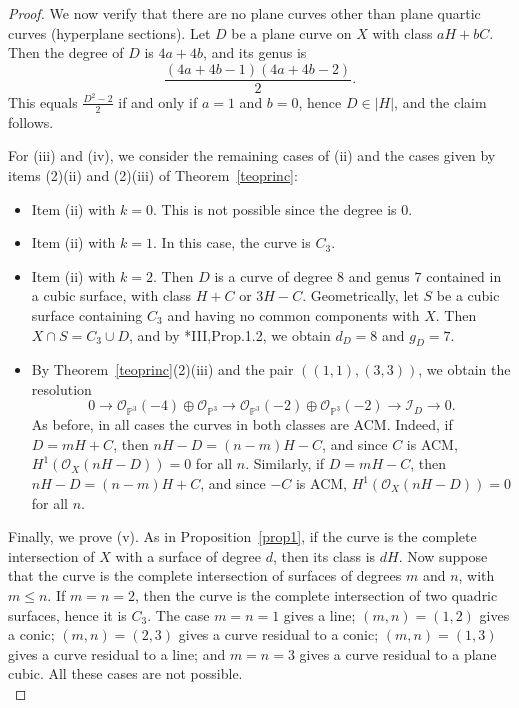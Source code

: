 \documentclass[12pt,reqno]{amsart}
\theoremstyle{plain}
\theoremstyle{definition}
\theoremstyle{remark}
\theoremstyle{definition}
\newcommand{\PP}{\mathds{P}}
\newcommand{\PPP}{\PP^{3}}
\newcommand{\ii}{\mathscr{I}}
\newcommand{\oo}{\mathcal{O}}
\begin{document}
\begin{proof}
We now verify that there are no plane curves other than plane quartic curves (hyperplane sections).
Let $D$ be a plane curve on $X$ with class $aH+bC$.
Then the degree of $D$ is $4a+4b$, and its genus is
\[
\frac{(4a+4b-1)(4a+4b-2)}{2}.
\]
This equals $\frac{D^{2}-2}{2}$ if and only if $a=1$ and $b=0$, hence $D\in|H|$, and the claim follows.

For (iii) and (iv), we consider the remaining cases of (ii) and the cases given by items (2)(ii) and (2)(iii) of Theorem~\ref{teoprinc}:
\begin{itemize}
    \item[\textbf{Case 1:}] Item (ii) with $k=0$. This is not possible since the degree is $0$.

    \item[\textbf{Case 2:}] Item (ii) with $k=1$. In this case, the curve is $C_{3}$.

    \item[\textbf{Case 3:}] Item (ii) with $k=2$. Then $D$ is a curve of degree $8$ and genus $7$ contained in a cubic surface, with class $H+C$ or $3H-C$.  
    Geometrically, let $S$ be a cubic surface containing $C_{3}$ and having no common components with $X$. Then
    $X\cap S=C_{3}\cup D$, and by \cite{mdp2}*{III,Prop.1.2}, we obtain
    $d_{D}=8$ and $g_{D}=7$.

    \item[\textbf{Case 4:}] By Theorem~\ref{teoprinc}(2)(iii) and the pair $((1,1),(3,3))$, we obtain the resolution
    \[
    0\to \oo_{\PPP}(-4)\oplus \oo_{\PPP}
    \to \oo_{\PPP}(-2)\oplus \oo_{\PPP}(-2)
    \to \ii_{D}\to 0.
    \]
    As before, in all cases the curves in both classes are ACM. Indeed, if $D=mH+C$, then
    $nH-D=(n-m)H-C$, and since $C$ is ACM,
    $H^{1}(\oo_{X}(nH-D))=0$ for all $n$.
    Similarly, if $D=mH-C$, then
    $nH-D=(n-m)H+C$, and since $-C$ is ACM,
    $H^{1}(\oo_{X}(nH-D))=0$ for all $n$.
\end{itemize}

Finally, we prove (v). As in Proposition~\ref{prop1}, if the curve is the complete intersection of $X$ with a surface of degree $d$, then its class is $dH$.
Now suppose that the curve is the complete intersection of surfaces of degrees $m$ and $n$, with $m\leq n$.
If $m=n=2$, then the curve is the complete intersection of two quadric surfaces, hence it is $C_{3}$.
The case $m=n=1$ gives a line; $(m,n)=(1,2)$ gives a conic; $(m,n)=(2,3)$ gives a curve residual to a conic;
$(m,n)=(1,3)$ gives a curve residual to a line; and $m=n=3$ gives a curve residual to a plane cubic.
All these cases are not possible.\\
\end{proof}
\end{document}
